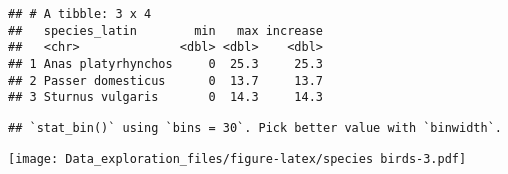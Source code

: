 \documentclass[]{article}
\newenvironment{Shaded}{\begin{snugshade}}{\end{snugshade}}
\newcommand{\KeywordTok}[1]{\textcolor[rgb]{0.13,0.29,0.53}{\textbf{#1}}}
\newcommand{\DataTypeTok}[1]{\textcolor[rgb]{0.13,0.29,0.53}{#1}}
\newcommand{\DecValTok}[1]{\textcolor[rgb]{0.00,0.00,0.81}{#1}}
\newcommand{\StringTok}[1]{\textcolor[rgb]{0.31,0.60,0.02}{#1}}
\newcommand{\CommentTok}[1]{\textcolor[rgb]{0.56,0.35,0.01}{\textit{#1}}}
\newcommand{\OtherTok}[1]{\textcolor[rgb]{0.56,0.35,0.01}{#1}}
\newcommand{\OperatorTok}[1]{\textcolor[rgb]{0.81,0.36,0.00}{\textbf{#1}}}
\newcommand{\NormalTok}[1]{#1}
\begin{document}
\begin{Shaded}
\end{Shaded}

\begin{verbatim}
## # A tibble: 3 x 4
##   species_latin        min   max increase
##   <chr>              <dbl> <dbl>    <dbl>
## 1 Anas platyrhynchos     0  25.3     25.3
## 2 Passer domesticus      0  13.7     13.7
## 3 Sturnus vulgaris       0  14.3     14.3
\end{verbatim}

\begin{Shaded}
\end{Shaded}

\begin{verbatim}
## `stat_bin()` using `bins = 30`. Pick better value with `binwidth`.
\end{verbatim}

\texttt{[image: Data\_exploration\_files/figure-latex/species birds-3.pdf]}

\begin{Shaded}
\end{Shaded}
\end{document}
